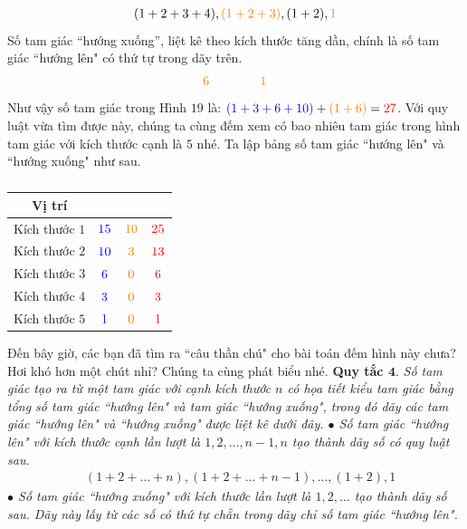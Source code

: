 \begin{align*}
	(1+2+3+4), {\color{orange}{(1+2+3)}}, (1+2), {\color{orange}{1}}
\end{align*}
Số tam giác “hướng xuống”, liệt kê theo kích thước tăng dần, chính là số tam giác ``hướng lên" có thứ tự {\color{orange}{chẵn}} trong dãy trên.
\begin{align*}
	{\color{orange}{6}	\qquad \qquad	1 }
\end{align*}
Như vậy số tam giác trong Hình $19$ là: ${\color{blue}{(1+3+6+10)}} + {\color{orange}{(1+6)}} = {\color{red}{27}}$.
\vskip 0.1cm
Với quy luật vừa tìm được này, chúng ta cùng đếm xem có bao nhiêu tam giác trong hình tam giác với kích thước cạnh là $5$ nhé.
Ta lập bảng số tam giác ``hướng lên" và ``hướng xuống" như sau.
	\begin{table}[H]
	\vspace*{-5pt}
	\centering
	\captionsetup{labelformat= empty, justification=centering}
	\setlength{\tabcolsep}{5pt}
	\renewcommand{\arraystretch}{1.3}
	\begin{tabular}{|c|c|c|c|}
		\hline
		Vị trí & {\color{blue}{Lên}}  & {\color{orange}{Xuống}} & {\color{red}{Tổng}}\\
		\hline
		Kích thước $1$ & ${\color{blue}{15}}$ & ${\color{orange}{10}}$ &${\color{red}{25}}$\\
		\hline
		Kích thước $2$ & ${\color{blue}{10}}$ & ${\color{orange}{3}}$ & ${\color{red}{13}}$\\
		\hline
		Kích thước $3$ & ${\color{blue}{6}}$ & ${\color{orange}{0}}$ & ${\color{red}{6}}$\\
		\hline
		Kích thước $4$ & ${\color{blue}{3}}$ & ${\color{orange}{0}}$ & ${\color{red}{3}}$\\
		\hline
		Kích thước $5$ & ${\color{blue}{1}}$ & ${\color{orange}{0}}$ & ${\color{red}{1}}$ \\
		\hline
	\end{tabular}
	\caption{}
\end{table}
Đến bây giờ, các bạn đã tìm ra ``câu thần chú" cho bài toán đếm hình này chưa? Hơi khó hơn một chút nhỉ? Chúng ta cùng phát biểu nhé.
\vskip 0.1cm
{\bf\color{toancuabi} Quy tắc $\pmb{4.}$} \textit{Số tam giác tạo ra từ một tam giác với cạnh kích thước $n$ có họa tiết kiểu tam giác bằng tổng số tam giác ``hướng lên" và tam giác ``hướng xuống", trong đó dãy các tam giác ``hướng lên" và ``hướng xuống" được liệt kê dưới đây.
	\vskip 0.1cm
	$\bullet$ Số tam giác ``hướng lên" với kích thước cạnh lần lượt là $1, 2,\ldots, n-1, n$ tạo thành dãy số có quy luật sau.
	\begin{align*}
		&(1\!+\!2\!+\!\ldots\!+\!n), (1\!+\!2\!+\!\ldots\!+\! n\!-\!1), \ldots,(1\!+\!2), 1 
	\end{align*}
	$\bullet$ Số tam giác ``hướng xuống" với kích thước lần lượt là $1, 2,\ldots$ tạo thành dãy số sau. Dãy này lấy từ các số có thứ tự chẵn trong dãy chỉ số tam giác ``hướng lên".}
